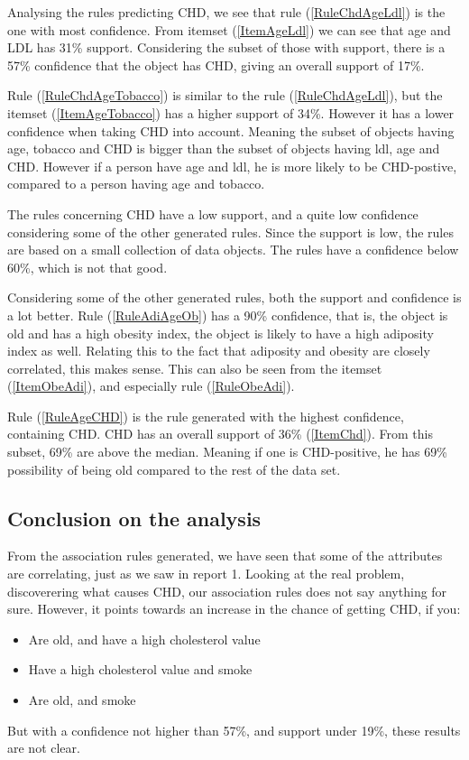 Analysing the rules predicting CHD, we see that rule (\ref{RuleChdAgeLdl}) is the one with most confidence. 
From itemset (\ref{ItemAgeLdl}) we can see that age and LDL has 31\% support. Considering the subset of those with support, there is a 57\% confidence that the object has CHD, giving an overall support of 17\%.


Rule (\ref{RuleChdAgeTobacco}) is similar to the rule (\ref{RuleChdAgeLdl}), but the itemset (\ref{ItemAgeTobacco}) has a higher support of 34\%. However it has a lower confidence when taking CHD into account. Meaning the subset of objects having age, tobacco and CHD is bigger than the subset of objects having ldl, age and CHD. However if a person have age and ldl, he is more likely to be CHD-postive, compared to a person having age and tobacco.

The rules concerning CHD have a low support, and a quite low confidence considering some of the other generated rules. Since the support is low, the rules are based on a small collection of data objects. The rules have a confidence below 60\%, which is not that good.

Considering some of the other generated rules, both the support and confidence is a lot better. Rule (\ref{RuleAdiAgeOb}) has a 90\% confidence, that is, the object is old and has a high obesity index, the object is likely to have a high adiposity index as well. Relating this to the fact that adiposity and obesity are closely correlated, this makes sense. This can also be seen from the itemset (\ref{ItemObeAdi}), and especially rule (\ref{RuleObeAdi}).

Rule (\ref{RuleAgeCHD}) is the rule generated with the highest confidence, containing CHD. CHD has an overall support of 36\% (\ref{ItemChd}). From this subset, 69\% are above the median. Meaning if one is CHD-positive, he has 69\% possibility of being old compared to the rest of the data set.

\subsection{Conclusion on the analysis}
From the association rules generated, we have seen that some of the attributes are correlating, just as we saw in report 1. Looking at the real problem, discoverering what causes CHD, our association rules does not say anything for sure. However, it points towards an increase in the chance of getting CHD, if you:
\begin{itemize}
\item Are old, and have a high cholesterol value
\item Have a high cholesterol value and smoke
\item Are old, and smoke
\end{itemize}
But with a confidence not higher than 57\%, and support under 19\%, these results are not clear.